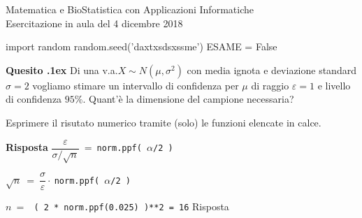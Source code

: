 \documentclass[11pt,twoside,a4paper]{article}
\newcounter{quesito}
\newenvironment{question}{\addtocounter{quesito}{1}\par\textbf{Quesito \thequesito.\kern1ex}}{\vspace{0.5\parskip}}
\newenvironment{answer}{\par\textbf{Risposta\quad}}{\vspace{\parskip}}
\begin{document}
\colorbox{blue!10}{\begin{minipage}{\textwidth}
Matematica e BioStatistica con Applicazioni Informatiche\\
Esercitazione in aula del 4 dicembre 2018
\end{minipage}}



\begin{pycode}
import random
random.seed('daxtxsdsxssme')
ESAME = False
\end{pycode}


\bigskip\bigskip
\begin{question}
Di una v.a.\@ $X\sim N(\mu,\sigma^2)$ con media ignota e deviazione standard $\sigma=2$ vogliamo stimare un intervallo di confidenza per $\mu$ di raggio $\varepsilon=1$ e livello di confidenza $95\%$. Quant'è la dimensione del campione necessaria?

Esprimere il risutato numerico tramite (solo) le funzioni elencate in calce.

\begin{answer}
$\dfrac{\varepsilon}{\sigma/\sqrt{n}}\ =\ ${\tt norm.ppf( $\alpha$/2 ) }

$\sqrt{n}\ =\ \dfrac{\sigma}{\varepsilon} \cdot\ ${\tt norm.ppf( $\alpha$/2 ) }

$n\ =\ ${\tt {\color{blue} ( 2 * norm.ppf(0.025) )**2} =  16}\hfill{\color{blue} Risposta}
\end{answer}
\end{question}
\end{document}
